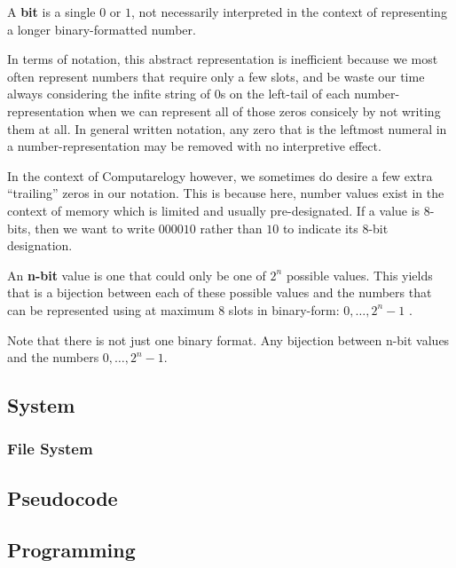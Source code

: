 \documentclass{article}
\newcommand{\definition}[1]{
	\vspace{10px}
	\noindent {[\sc Definition]} #1
	\vspace{10px}
}
\begin{document}
	\definition{A \textbf{bit} is a single $0$ or $1$, not necessarily interpreted in the context of representing a longer binary-formatted number.}

	In terms of notation, this abstract representation is inefficient because we most often represent numbers that require only a few slots, and be waste our time always considering the infite string of $0$s on the left-tail of each number-representation when we can represent all of those zeros consicely by not writing them at all. In general written notation, any zero that is the leftmost numeral in a number-representation may be removed with no interpretive effect.

	In the context of Computarelogy however, we sometimes do desire a few extra ``trailing'' zeros in our notation. This is because here, number values exist in the context of memory which is limited and usually pre-designated. If a value is 8-bits, then we want to write $000010$ rather than $10$ to indicate its 8-bit designation.

	\definition{An \textbf{n-bit} value is one that could only be one of $2^n$ possible values. This yields that is a bijection between each of these possible values and the numbers that can be represented using at maximum 8 slots in binary-form: $0, \dots, 2^n-1$}.

	Note that there is not just one binary format. Any bijection between n-bit values and the numbers $0, \dots, 2^n-1$.

\subsection{System}

\subsubsection{File System}
\subsubsection{}

\subsection{Pseudocode}


\subsection{Programming}
\end{document}
